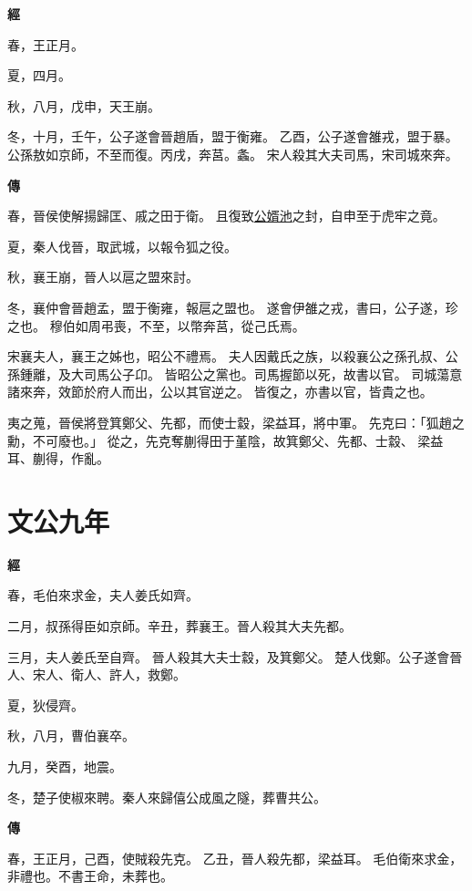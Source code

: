 \documentclass{ctexart}
\begin{document}
\textbf{經}



春，王正月。

夏，四月。

秋，八月，戊申，天王崩。

冬，十月，壬午，公子遂會晉趙盾，盟于衡雍。
乙酉，公子遂會雒戎，盟于暴。
公孫敖如京師，不至而復。丙戌，奔莒。螽。
宋人殺其大夫司馬，宋司城來奔。

\textbf{傳}



春，晉侯使解揚歸匡、戚之田于衛。
且復致\underline{公婿池}之封，自申至于虎牢之竟。

夏，秦人伐晉，取武城，以報令狐之役。

秋，襄王崩，晉人以扈之盟來討。

冬，襄仲會晉趙孟，盟于衡雍，報扈之盟也。
遂會伊雒之戎，書曰，公子遂，珍之也。
穆伯如周弔喪，不至，以幣奔莒，從己氏焉。

宋襄夫人，襄王之姊也，昭公不禮焉。
夫人因戴氏之族，以殺襄公之孫孔叔、公孫鍾離，及大司馬公子卬。
皆昭公之黨也。司馬握節以死，故書以官。
司城蕩意諸來奔，效節於府人而出，公以其官逆之。
皆復之，亦書以官，皆貴之也。

夷之蒐，晉侯將登箕鄭父、先都，而使士縠，梁益耳，將中軍。
先克曰：「狐趙之勳，不可廢也。」
從之，先克奪蒯得田于堇陰，故箕鄭父、先都、士縠、
梁益耳、蒯得，作亂。





\section{文公九年}


\textbf{經}



春，毛伯來求金，夫人姜氏如齊。

二月，叔孫得臣如京師。辛丑，葬襄王。晉人殺其大夫先都。

三月，夫人姜氏至自齊。
晉人殺其大夫士縠，及箕鄭父。
楚人伐鄭。公子遂會晉人、宋人、衛人、許人，救鄭。

夏，狄侵齊。

秋，八月，曹伯襄卒。

九月，癸酉，地震。

冬，楚子使椒來聘。秦人來歸僖公成風之隧，葬曹共公。

\textbf{傳}



春，王正月，己酉，使賊殺先克。
乙丑，晉人殺先都，梁益耳。
毛伯衛來求金，非禮也。不書王命，未葬也。
\end{document}
